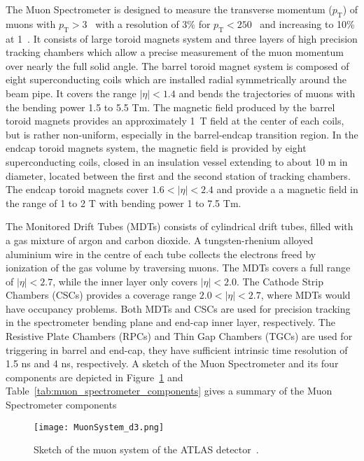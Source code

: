 The Muon Spectrometer is designed to measure the transverse momentum ($p_{\mathrm{T}}$) of muons with $p_{\mathrm{T}} > 3$~{\GeV} with a resolution of 3\% for $p_{\mathrm{T}} < 250$~{\GeV} and increasing to 10\% at 1~{\TeV}.
It consists of large toroid magnets system and three layers of high precision tracking chambers which allow a precise measurement of the muon momentum over nearly the full solid angle.
The barrel toroid magnet system is composed of eight superconducting coils which are installed radial symmetrically around the beam pipe.
It covers the range $|\eta| < 1.4$ and bends the trajectories of muons with the bending power 1.5 to 5.5 Tm.
The magnetic field produced by the barrel toroid magnets provides an approximately 1~T field at the center of each coils, but is rather non-uniform, especially in the barrel-endcap transition region.
In the endcap toroid magnets system, the magnetic field is provided by eight superconducting coils, closed in an insulation vessel extending to about 10 m in diameter, located between the first and the second station of tracking chambers.
The endcap toroid magnets cover $1.6 < |\eta| < 2.4$ and provide a a magnetic field in the range of 1 to 2 T with bending power 1 to 7.5 Tm.

The Monitored Drift Tubes (MDTs) consists of cylindrical drift tubes, filled with a gas mixture of argon and carbon dioxide.
A tungsten-rhenium alloyed aluminium wire in the centre of each tube collects the electrons freed by ionization of the gas volume by traversing muons.
The MDTs covers a full range of $|\eta| < 2.7$, while the inner layer only covers $|\eta| < 2.0$.
The Cathode Strip Chambers (CSCs) provides a coverage range $2.0 < |\eta| < 2.7$, where MDTs would have occupancy problems.
Both MDTs and CSCs are used for precision tracking in the spectrometer bending plane and end-cap inner layer, respectively.
The Resistive Plate Chambers (RPCs) and Thin Gap Chambers (TGCs) are used for triggering in barrel and end-cap, they have sufficient intrinsic time resolution of 1.5 ns and 4 ns, respectively.
A sketch of the Muon Spectrometer and its four components are depicted in Figure~\ref{fig:muon_spectrometer} and Table~\ref{tab:muon_spectrometer_components} gives a summary of the Muon Spectrometer components

\begin{figure}[htbp]
\begin{center}
\texttt{[image: MuonSystem\_d3.png]}
\caption{Sketch of the muon system of the ATLAS detector~\cite{1748-0221-3-08-S08003}.}
\label{fig:muon_spectrometer}
\end{center}
\end{figure}


